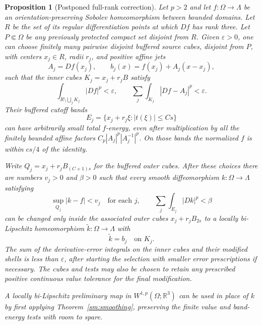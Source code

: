 \documentclass[11pt]{article}
\numberwithin{equation}{section}
\newtheorem{proposition}[theorem]{Proposition}
\theoremstyle{definition}
\theoremstyle{remark}
\newcommand{\R}{\mathbb R}
\begin{document}
\begin{proposition}[Postponed full-rank correction]
\label{hp:full-rank-correction}
Let $p>2$ and let $f:\Omega\to\Lambda$ be an orientation-preserving
Sobolev homeomorphism between bounded domains.  Let $R$ be the set
of its regular differentiation points at which $Df$ has rank three.
Let $P\Subset\Omega$ be any previously protected compact set
disjoint from $R$.  Given $\varepsilon>0$, one can choose finitely
many pairwise disjoint buffered source cubes, disjoint from $P$,
with centers $x_j\in R$, radii $r_j$, and positive affine jets
\[
 A_j=Df(x_j),\qquad
 b_j(x)=f(x_j)+A_j(x-x_j),
\]
such that the inner cubes $K_j=x_j+r_jB$ satisfy
\begin{equation}\label{hp:full-rank-core-tests}
 \int_{R\setminus\bigcup_jK_j}|Df|^p<\varepsilon,
 \qquad
 \sum_j\int_{K_j}|Df-A_j|^p<\varepsilon.
\end{equation}
Their buffered cutoff bands
\[
 E_j=\{x_j+r_j\xi:|t(\xi)|\leq Cs\}
\]
can have arbitrarily small total $f$-energy, even after multiplication
by all the finitely bounded affine factors
$C_p|A_j|^p|A_j^{-1}|^p$.  On those bands the normalized $f$ is
within $cs/4$ of the identity.

Write $Q_j=x_j+r_jB_{(C+1)s}$ for the buffered outer cubes.
After these choices there are numbers $v_j>0$ and $\beta>0$ such
that every smooth diffeomorphism $k:\Omega\to\Lambda$ satisfying
\[
 \sup_{Q_j}|k-f|<v_j\quad\text{for each }j,
 \qquad \sum_j\int_{E_j}|Dk|^p<\beta
\]
can be changed only inside the associated outer cubes
$x_j+r_jB_{2s}$ to a locally bi-Lipschitz homeomorphism
$\widetilde k:\Omega\to\Lambda$ with
\[
 \widetilde k=b_j\quad\text{on }K_j.
\]
The sum of the derivative-error integrals on the inner cubes and
their modified shells is less than $\varepsilon$, after starting the
selection with smaller error prescriptions if necessary.  The cubes
and tests may also be chosen to retain any prescribed positive
continuous value tolerance for the final modification.

A locally bi-Lipschitz preliminary map in $W^{1,p}(\Omega;\R^3)$
can be used in place of $k$ by first applying Theorem~\ref{sm:smoothing}, preserving the finite
value and band-energy tests with room to spare.
\end{proposition}
\end{document}
